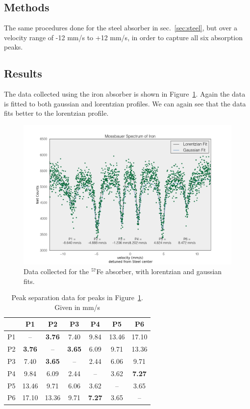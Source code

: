 \documentclass[paper=a4, fontsize=11pt, abstract=on]{scrartcl} %
\numberwithin{equation}{section}
\numberwithin{figure}{section}
\numberwithin{table}{section}
\begin{document}
\subsection{Methods}
\label{sec:irmeth}

The same procedures done for the steel absorber in
sec.~\ref{sec:steel}, but over a velocity range of -12 mm/s to +12
mm/s, in order to capture all six absorption peaks.

\subsection{Results}
\label{sec:irres}

The data collected using the iron absorber is shown in
Figure~\ref{fig:iron}. Again the data is fitted to both gaussian and
lorentzian profiles. We can again see that the data fits better to the
lorentzian profile. 

\begin{figure}[h]
  \centering
  \includegraphics[width=.9\textwidth]{ironfit}
  \caption{Data collected for the $^{57}$Fe absorber, with lorentzian and gaussian fits.}
  \label{fig:iron}
\end{figure}

\begin{table}[h]
  \centering
  \begin{tabular}{r|cccccc}
       & P1 & P2 & P3 & P4 & P5 & P6 \\ \hline
    P1 & --   & \textbf{3.76}  & 7.40  & 9.84 & 13.46  & 17.10    \\
    P2 & \textbf{3.76}   & --  &  \textbf{3.65}   & 6.09  & 9.71 & 13.36   \\
    P3 & 7.40   & \textbf{3.65}   & --  & 2.44  & 6.06   & 9.71   \\
    P4 & 9.84   & 6.09   & 2.44   & -- & 3.62   & \textbf{7.27}  \\
    P5 & 13.46   & 9.71   & 6.06   & 3.62   & -- & 3.65 \\ 
    P6 & 17.10   & 13.36   & 9.71   & \textbf{7.27}   & 3.65 & --  \\
  \end{tabular}
  \caption{Peak separation data for peaks in
    Figure~\ref{fig:iron}. Given in mm/s}
  \label{tab:sep}
\end{table}
\end{document}
